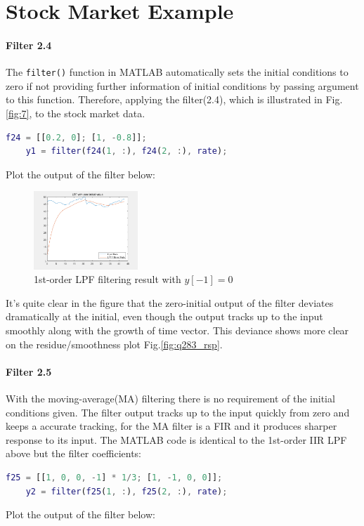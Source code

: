 \documentclass[conference]{IEEEtran}
\begin{document}
\section{Stock Market Example}
\paragraph{Filter 2.4}

The \lstinline{filter()} function in MATLAB automatically sets the initial conditions to zero if not providing further information of initial conditions by passing argument to this function. Therefore, applying the filter(2.4), which is illustrated in Fig.\ref{fig:7}, to the stock market data.
\begin{lstlisting}[language=matlab,style=matlab]
	f24 = [[0.2, 0]; [1, -0.8]];
	y1 = filter(f24(1, :), f24(2, :), rate);
\end{lstlisting}
Plot the output of the filter below:

\begin{figure}[htpb]
	\centering
	\includegraphics[width=0.35\textwidth]{../matlab/q28_1.png}
	\caption{1st-order LPF filtering result with \(y[-1]=0\)}
	\label{fig:q281}
\end{figure}

It's quite clear in the figure that the zero-initial output of the filter deviates dramatically at the initial, even though the output tracks up to the input smoothly along with the growth of time vector. This deviance shows more clear on the residue/smoothness plot Fig.\ref{fig:q283_rsp}.

\paragraph{Filter 2.5}

With the moving-average(MA) filtering there is no requirement of the initial conditions given. The filter output tracks up to the input quickly from zero and keeps a accurate tracking, for the MA filter is a FIR and it produces sharper response to its input. The MATLAB code is identical to the 1st-order IIR LPF above but the filter coefficients:
\begin{lstlisting}[language=matlab,style=matlab]
	f25 = [[1, 0, 0, -1] * 1/3; [1, -1, 0, 0]];
	y2 = filter(f25(1, :), f25(2, :), rate);
\end{lstlisting}
Plot the output of the filter below:
\end{document}
